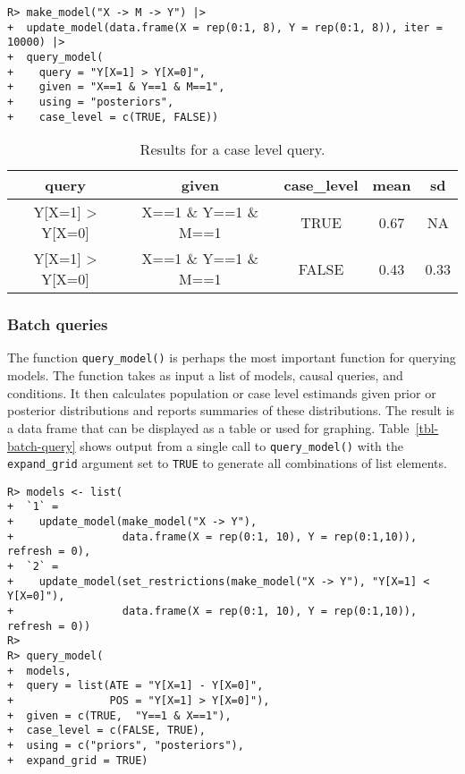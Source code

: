 \documentclass[
  11pt,
  article]{jss}
\begin{document}
\begin{verbatim}
R> make_model("X -> M -> Y") |>
+  update_model(data.frame(X = rep(0:1, 8), Y = rep(0:1, 8)), iter = 10000) |> 
+  query_model(
+    query = "Y[X=1] > Y[X=0]",
+    given = "X==1 & Y==1 & M==1",
+    using = "posteriors",
+    case_level = c(TRUE, FALSE))
\end{verbatim}

\hypertarget{tbl-case-level}{}
\begin{longtable}{ccccc}
\caption{\label{tbl-case-level}Results for a case level query. }\tabularnewline

\toprule
query & given & case\_level & mean & sd\\
\midrule
Y[X=1] > Y[X=0] & X==1 \& Y==1 \& M==1 & TRUE & 0.67 & NA\\
Y[X=1] > Y[X=0] & X==1 \& Y==1 \& M==1 & FALSE & 0.43 & 0.33\\
\bottomrule
\end{longtable}

\hypertarget{batch-queries}{%
\subsubsection{Batch queries}\label{batch-queries}}

The function \texttt{query\_model()} is perhaps the most important
function for querying models. The function takes as input a list of
models, causal queries, and conditions. It then calculates population or
case level estimands given prior or posterior distributions and reports
summaries of these distributions. The result is a data frame that can be
displayed as a table or used for graphing. Table~\ref{tbl-batch-query}
shows output from a single call to \texttt{query\_model()} with the
\texttt{expand\_grid} argument set to \texttt{TRUE} to generate all
combinations of list elements.

\begin{verbatim}
R> models <- list(
+  `1` = 
+    update_model(make_model("X -> Y"),
+                 data.frame(X = rep(0:1, 10), Y = rep(0:1,10)), refresh = 0),
+  `2` = 
+    update_model(set_restrictions(make_model("X -> Y"), "Y[X=1] < Y[X=0]"),
+                 data.frame(X = rep(0:1, 10), Y = rep(0:1,10)), refresh = 0))
R> 
R> query_model(
+  models,
+  query = list(ATE = "Y[X=1] - Y[X=0]", 
+               POS = "Y[X=1] > Y[X=0]"),
+  given = c(TRUE,  "Y==1 & X==1"),
+  case_level = c(FALSE, TRUE),
+  using = c("priors", "posteriors"),
+  expand_grid = TRUE)
\end{verbatim}
\end{document}
